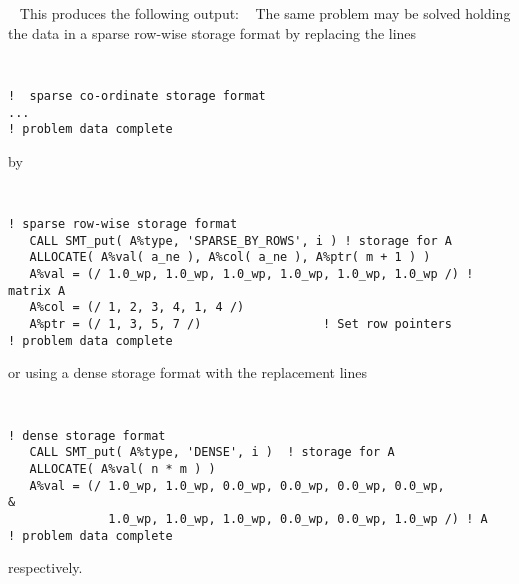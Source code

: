 \documentclass{galahad}
\begin{document}
{\tt \small
\VerbatimInput{\packageexample}
}
\noindent
This produces the following output:
{\tt \small
\VerbatimInput{\packageresults}
}
\noindent
The same problem may be solved holding the data in 
a sparse row-wise storage format by replacing the lines
{\tt \small
\begin{verbatim}
!  sparse co-ordinate storage format
...
! problem data complete   
\end{verbatim}
}
\noindent
by
{\tt \small
\begin{verbatim}
! sparse row-wise storage format
   CALL SMT_put( A%type, 'SPARSE_BY_ROWS', i ) ! storage for A
   ALLOCATE( A%val( a_ne ), A%col( a_ne ), A%ptr( m + 1 ) )
   A%val = (/ 1.0_wp, 1.0_wp, 1.0_wp, 1.0_wp, 1.0_wp, 1.0_wp /) ! matrix A
   A%col = (/ 1, 2, 3, 4, 1, 4 /)
   A%ptr = (/ 1, 3, 5, 7 /)                 ! Set row pointers  
! problem data complete   
\end{verbatim}
}
\noindent
or using a dense storage format with the replacement lines
{\tt \small
\begin{verbatim}
! dense storage format
   CALL SMT_put( A%type, 'DENSE', i )  ! storage for A
   ALLOCATE( A%val( n * m ) )
   A%val = (/ 1.0_wp, 1.0_wp, 0.0_wp, 0.0_wp, 0.0_wp, 0.0_wp,          &
              1.0_wp, 1.0_wp, 1.0_wp, 0.0_wp, 0.0_wp, 1.0_wp /) ! A
! problem data complete   
\end{verbatim}
}
\noindent
respectively.
\end{document}
